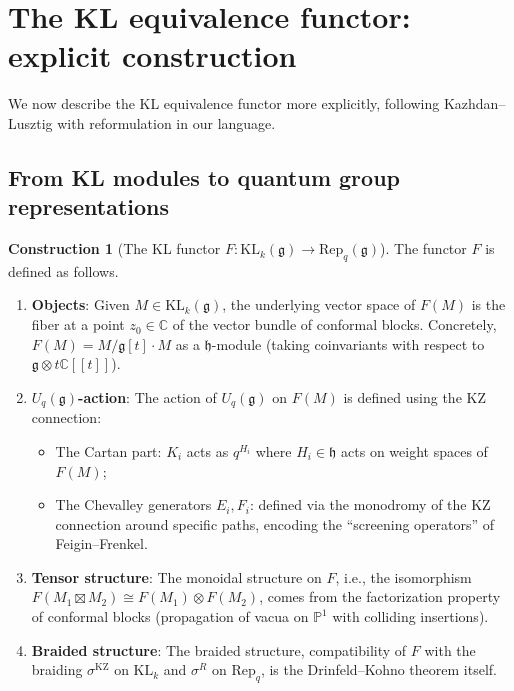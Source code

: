 \documentclass[11pt]{article}
\theoremstyle{definition}
\newtheorem{construction}[theorem]{Construction}
\theoremstyle{remark}
\newcommand{\Rep}{\mathrm{Rep}}
\newcommand{\Uq}{U_q}
\newcommand{\frakg}{\mathfrak{g}}
\newcommand{\frakh}{\mathfrak{h}}
\newcommand{\KL}{\mathrm{KL}}
\newcommand{\KZ}{\mathrm{KZ}}
\begin{document}
\section{The KL equivalence functor: explicit construction}
\label{sec:kl-functor}

We now describe the KL equivalence functor more explicitly, following
Kazhdan--Lusztig with reformulation in our language.

\subsection{From KL modules to quantum group representations}
\label{subsec:kl-to-qg}

\begin{construction}[The KL functor $F \colon \KL_k(\frakg) \to \Rep_q(\frakg)$]
\label{constr:kl-functor}
The functor $F$ is defined as follows.
\begin{enumerate}[label=\textbf{Step \arabic*.}]
 \item \textbf{Objects}: Given $M \in \KL_k(\frakg)$, the underlying
 vector space of $F(M)$ is the fiber at a point $z_0 \in \mathbb{C}$
 of the vector bundle of conformal blocks. Concretely,
 $F(M) = M / \frakg[t] \cdot M$ as a $\frakh$-module (taking
 coinvariants with respect to $\frakg \otimes t\mathbb{C}[[t]]$).
 \item \textbf{$\Uq(\frakg)$-action}: The action of $\Uq(\frakg)$
 on $F(M)$ is defined using the KZ connection:
 \begin{itemize}
 \item The Cartan part: $K_i$ acts as $q^{H_i}$ where $H_i \in \frakh$
 acts on weight spaces of $F(M)$;
 \item The Chevalley generators $E_i, F_i$: defined via the
 monodromy of the KZ connection around specific paths,
 encoding the ``screening operators'' of Feigin--Frenkel.
 \end{itemize}
 \item \textbf{Tensor structure}: The monoidal structure on $F$,
 i.e., the isomorphism
 $F(M_1 \boxtimes M_2) \cong F(M_1) \otimes F(M_2)$,
 comes from the factorization property of conformal blocks
 (propagation of vacua on $\mathbb{P}^1$ with colliding insertions).
 \item \textbf{Braided structure}: The braided structure,
 compatibility of $F$ with the braiding $\sigma^{\KZ}$ on $\KL_k$
 and $\sigma^R$ on $\Rep_q$, is the Drinfeld--Kohno theorem itself.
\end{enumerate}
\end{construction}
\end{document}

